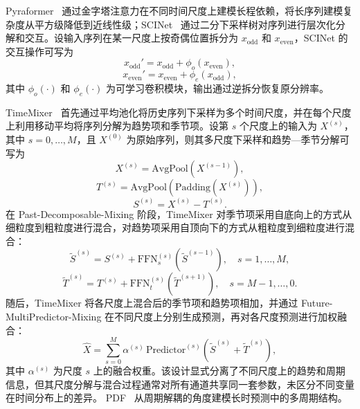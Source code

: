 Pyraformer~\cite{pyraformer} 通过金字塔注意力在不同时间尺度上建模长程依赖，将长序列建模复杂度从平方级降低到近线性级；SCINet~\cite{scinet} 通过二分下采样树对序列进行层次化分解和交互。设输入序列在某一尺度上按奇偶位置拆分为 $x_{\mathrm{odd}}$ 和 $x_{\mathrm{even}}$，SCINet 的交互操作可写为
\begin{equation}
x_{\mathrm{odd}}' = x_{\mathrm{odd}} + \phi_{o}\!\left(x_{\mathrm{even}}\right),
\end{equation}
\begin{equation}
x_{\mathrm{even}}' = x_{\mathrm{even}} + \phi_{e}\!\left(x_{\mathrm{odd}}\right),
\end{equation}
其中 $\phi_o(\cdot)$ 和 $\phi_e(\cdot)$ 为可学习卷积模块，输出通过逆拆分恢复原分辨率。

TimeMixer~\cite{timemixer} 首先通过平均池化将历史序列下采样为多个时间尺度，并在每个尺度上利用移动平均将序列分解为趋势项和季节项。设第 $s$ 个尺度上的输入为 $X^{(s)}$，其中 $s=0,\ldots,M$，且 $X^{(0)}$ 为原始序列，则其多尺度下采样和趋势—季节分解可写为
\begin{equation}
    X^{(s)} = \mathrm{AvgPool}\!\left(X^{(s-1)}\right),
\end{equation}
\begin{equation}
    T^{(s)} = \mathrm{AvgPool}\!\left(\mathrm{Padding}\!\left(X^{(s)}\right)\right),
\end{equation}
\begin{equation}
    S^{(s)} = X^{(s)} - T^{(s)}.
\end{equation}
在 Past-Decomposable-Mixing 阶段，TimeMixer 对季节项采用自底向上的方式从细粒度到粗粒度进行混合，对趋势项采用自顶向下的方式从粗粒度到细粒度进行混合：
\begin{equation}
\tilde{S}^{(s)} = S^{(s)} + \mathrm{FFN}_{s}^{(s)}\!\left(\tilde{S}^{(s-1)}\right),
\quad s=1,\ldots,M,
\end{equation}
\begin{equation}
\tilde{T}^{(s)} = T^{(s)} + \mathrm{FFN}_{t}^{(s)}\!\left(\tilde{T}^{(s+1)}\right),
\quad s=M-1,\ldots,0.
\end{equation}
随后，TimeMixer 将各尺度上混合后的季节项和趋势项相加，并通过 Future-MultiPredictor-Mixing 在不同尺度上分别生成预测，再对各尺度预测进行加权融合：
\begin{equation}
\hat{X} = \sum_{s=0}^{M} \alpha^{(s)} \, \mathrm{Predictor}^{(s)}\!\left(\tilde{S}^{(s)} + \tilde{T}^{(s)}\right),
\end{equation}
其中 $\alpha^{(s)}$ 为尺度 $s$ 上的融合权重。该设计显式分离了不同尺度上的趋势和周期信息，但其尺度分解与混合过程通常对所有通道共享同一套参数，未区分不同变量在时间分布上的差异。
PDF~\cite{pdf} 从周期解耦的角度建模长时预测中的多周期结构。

